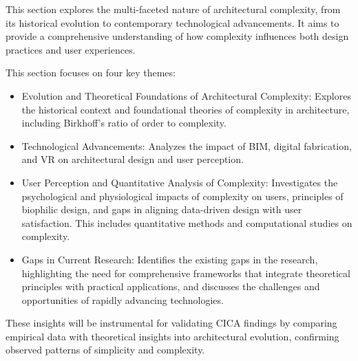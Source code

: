 






This section explores the multi-faceted nature of architectural complexity, from its historical evolution to contemporary technological advancements.
It aims to provide a comprehensive understanding of how complexity influences both design practices and user experiences.

This section focuses on four key themes:
\begin{itemize}
    \item Evolution and Theoretical Foundations of Architectural Complexity: Explores the historical context and foundational theories of complexity in architecture, including Birkhoff's ratio of order to complexity.
    \item Technological Advancements: Analyzes the impact of BIM, digital fabrication, and VR on architectural design and user perception.
    \item User Perception and Quantitative Analysis of Complexity: Investigates the psychological and physiological impacts of complexity on users, principles of biophilic design, and gaps in aligning data-driven design with user satisfaction.
    This includes quantitative methods and computational studies on complexity.
    \item Gaps in Current Research: Identifies the existing gaps in the research, highlighting the need for comprehensive frameworks that integrate theoretical principles with practical applications, and discusses the challenges and opportunities of rapidly advancing technologies.
\end{itemize}

These insights will be instrumental for validating CICA findings by comparing empirical data with theoretical insights into architectural evolution, confirming observed patterns of simplicity and complexity.




